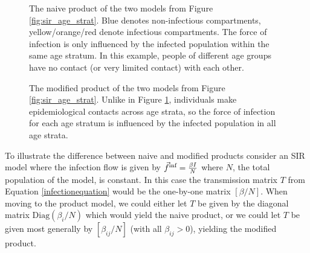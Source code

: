 \begin{figure}
    \centering
    
    \caption{The naive product of the two models from Figure \ref{fig:sir_age_strat}. Blue denotes non-infectious compartments, yellow/orange/red denote infectious compartments. The force of infection is only influenced by the infected population within the same age stratum. In this example, people of different age groups have no contact (or very limited contact) with each other.}
    \label{fig:naive_product}
\end{figure}

\begin{figure}
    \centering
    
    \caption{The modified product of the two models from Figure \ref{fig:sir_age_strat}. Unlike in Figure \ref{fig:naive_product}, individuals make epidemiological contacts across age strata, so the force of infection for each age stratum is influenced by the infected population in all age strata.}
    \label{fig:modified_product}
\end{figure}

\FloatBarrier

To illustrate the difference between naive and modified products consider an SIR model where the infection flow is given by $\vec{f}^\text{inf} = \frac{\beta I}{N}$ where $N$, the total population of the model, is constant. In this case the transmission matrix $T$ from Equation \ref{infectionequation} would be the one-by-one matrix $\left[ \beta/N \right]$.
When moving to the product model, we could either let $T$ be given by the diagonal matrix $\textrm{Diag}(\beta_i/N)$
which would yield the naive product, or we could let $T$ be given most generally by $\left[ \beta_{ij}/N \right]$
(with all $\beta_{ij}>0$), yielding the modified product.

